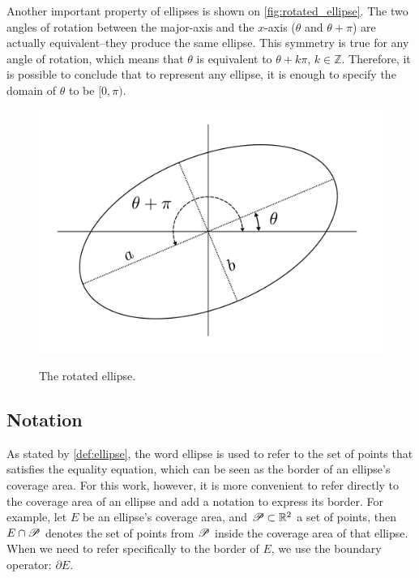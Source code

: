 Another important property of ellipses is shown on \autoref{fig:rotated_ellipse}. The two angles of rotation between the major-axis and the $x$-axis ($\theta$ and $\theta+\pi$) are actually equivalent--they produce the same ellipse. This symmetry is true for any angle of rotation, which means that $\theta$ is equivalent to $\theta+k\pi$, $k\in\mathbb{Z}$. Therefore, it is possible to conclude that to represent any ellipse, it is enough to specify the domain of $\theta$ to be $[0, \pi)$.

\begin{figure}[H]
	\centering
	
	\caption{The rotated ellipse.}
	\includegraphics[scale=.38]{tex/figures/rotated_ellipse}
	\fautor
	\label{fig:rotated_ellipse}
\end{figure}


\subsection{Notation}

As stated by \autoref{def:ellipse}, the word ellipse is used to refer to the set of points that satisfies the equality equation, which can be seen as the border of an ellipse's coverage area. For this work, however, it is more convenient to refer directly to the coverage area of an ellipse and add a notation to express its border. For example, let $E$ be an ellipse's coverage area, and $\mathscr{P} \subset \mathbb{R}^2$ a set of points, then $E \cap \mathscr{P}$ denotes the set of points from $\mathscr{P}$ inside the coverage area of that ellipse. When we need to refer specifically to the border of $E$, we use the boundary operator: $\partial E$.


